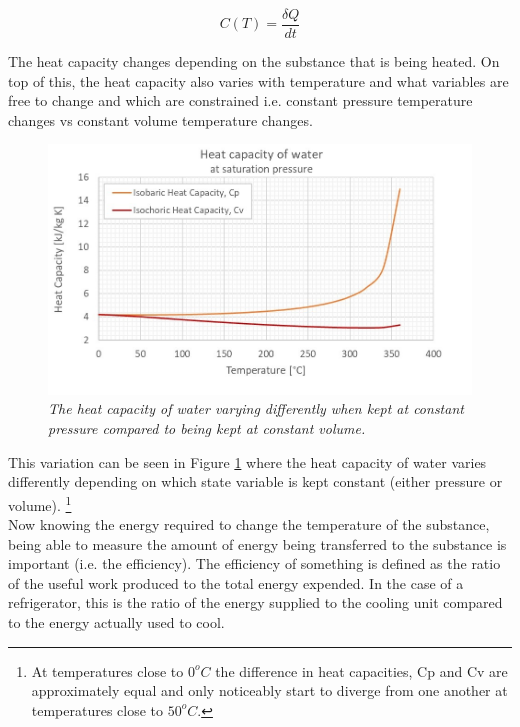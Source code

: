 \documentclass[10pt]{article}
\begin{document}
\begin{equation}\label{eq:heat_cap}
    C(T) = \frac{\delta Q}{dt}
\end{equation}

The heat capacity changes depending on the substance that is being heated. On top of this, the heat capacity also varies with temperature and what variables are free to change and which are constrained i.e. constant pressure temperature changes vs constant volume temperature changes.\\

\begin{figure}[h!]
    \centering
    \includegraphics[scale=.75]{Heat_capacity_C.jpg}
    \caption{\it{The heat capacity of water varying differently when kept at constant pressure compared to being kept at constant volume\cite{heat_cap}.}}
    \label{fig:heat_cap_water}
\end{figure}

This variation can be seen in Figure \ref{fig:heat_cap_water} where the heat capacity of water varies differently depending on which state variable is kept constant (either pressure or volume). \footnote{At temperatures close to $0^oC$ the difference in heat capacities, Cp and Cv are approximately equal and only noticeably start to diverge from one another at temperatures close to $50^oC$.}\\

Now knowing the energy required to change the temperature of the substance, being able to measure the amount of energy being transferred to the substance is important (i.e. the efficiency). The efficiency of something is defined as the ratio of the useful work produced to the total energy expended. In the case of a refrigerator, this is the ratio of the energy supplied to the cooling unit compared to the energy actually used to cool.\\
\end{document}
